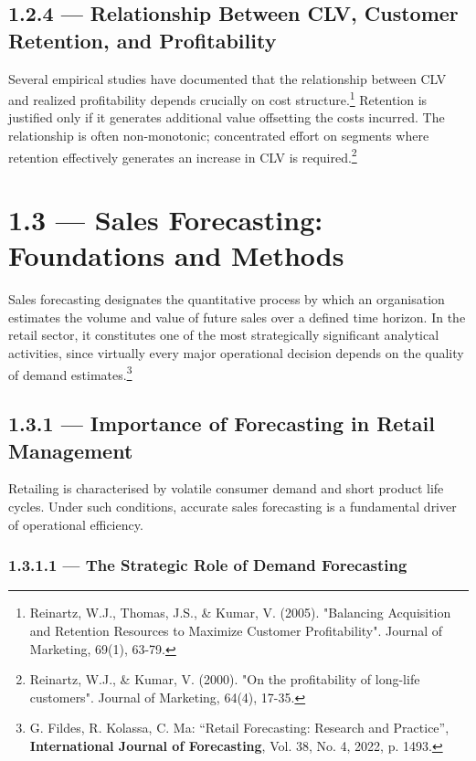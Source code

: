 \documentclass[12pt,a4paper,oneside]{report}
\begin{document}
\subsection{1.2.4 — Relationship Between CLV, Customer Retention, and Profitability}

Several empirical studies have documented that the relationship between CLV and realized profitability depends crucially on cost structure.\footnote{Reinartz, W.J., Thomas, J.S., \& Kumar, V. (2005). "Balancing Acquisition and Retention Resources to Maximize Customer Profitability". Journal of Marketing, 69(1), 63-79.} Retention is justified only if it generates additional value offsetting the costs incurred. The relationship is often non-monotonic; concentrated effort on segments where retention effectively generates an increase in CLV is required.\footnote{Reinartz, W.J., \& Kumar, V. (2000). "On the profitability of long-life customers". Journal of Marketing, 64(4), 17-35.}

\section{1.3 — Sales Forecasting: Foundations and Methods}
\label{sec:1.3}

Sales forecasting designates the quantitative process by which an organisation estimates the volume and value of future sales over a defined time horizon. In the retail sector, it constitutes one of the most strategically significant analytical activities, since virtually every major operational decision depends on the quality of demand estimates.\footnote{G. Fildes, R. Kolassa, C. Ma: ``Retail Forecasting: Research and Practice'', \textbf{International Journal of Forecasting}, Vol. 38, No. 4, 2022, p. 1493.}

\subsection{1.3.1 — Importance of Forecasting in Retail Management}
\label{subsec:1.3.1}

Retailing is characterised by volatile consumer demand and short product life cycles. Under such conditions, accurate sales forecasting is a fundamental driver of operational efficiency.

\subsubsection{1.3.1.1 — The Strategic Role of Demand Forecasting}
\end{document}
